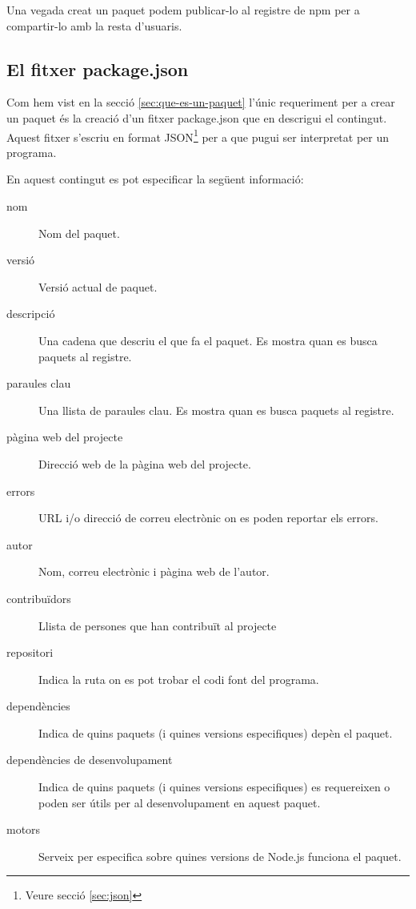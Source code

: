 Una vegada creat un paquet podem publicar-lo al registre de npm per a compartir-lo amb la resta d'usuaris. 

\subsection{El fitxer package.json}
\label{sec:fitxer-package.json}

Com hem vist en la secció \ref{sec:que-es-un-paquet} l'únic requeriment per a crear un paquet és la creació d'un fitxer package.json que en descrigui el contingut. Aquest fitxer s'escriu en format JSON\footnote{Veure secció \ref{sec:json}} per a que pugui ser interpretat per un programa.

En aquest contingut es pot especificar la següent informació: 
\begin{description}
\item[nom] {Nom del paquet.}
\item[versió] {Versió actual de paquet.}
\item[descripció] {Una cadena que descriu el que fa el paquet. Es mostra quan es busca paquets al registre.}
\item[paraules clau] {Una llista de paraules clau. Es mostra quan es busca paquets al registre.}
\item[pàgina web del projecte] {Direcció web de la pàgina web del projecte.}
\item[errors] { URL i/o direcció de correu electrònic on es poden reportar els errors. }
\item[autor] {Nom, correu electrònic i pàgina web de l'autor.}
\item[contribuïdors] { Llista de persones que han contribuït al projecte}
\item[repositori] { Indica la ruta on es pot trobar el codi font del programa. }
\item[dependències] { Indica de quins paquets (i quines versions especifiques) depèn el paquet.}
\item[dependències de desenvolupament] { Indica de quins paquets (i quines versions especifiques) es requereixen o poden ser útils per al desenvolupament en aquest paquet.}
\item[motors] {Serveix per especifica sobre quines versions de Node.js funciona el paquet.}
\end{description}

